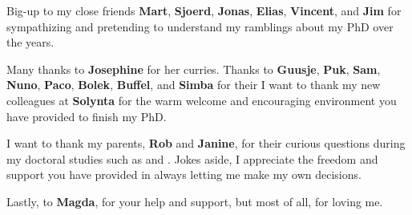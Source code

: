 \bigbreak \noindent
Big-up to my close friends \textbf{Mart}, \textbf{Sjoerd}, \textbf{Jonas}, \textbf{Elias}, \textbf{Vincent}, and \textbf{Jim} for sympathizing and pretending to understand my ramblings about my PhD over the years. 

\bigbreak \noindent
Many thanks to \textbf{Josephine} for her curries.
Thanks to \textbf{Guusje}, \textbf{Puk}, \textbf{Sam}, \textbf{Nuno}, \textbf{Paco}, \textbf{Bolek}, \textbf{Buffel}, and \textbf{Simba} for their 
I want to thank my new colleagues at \textbf{Solynta} for the warm welcome and encouraging environment you have provided to finish my PhD. 

\bigbreak \noindent
I want to thank my parents, \textbf{Rob} and \textbf{Janine}, for their curious questions during my doctoral studies such as  and . Jokes aside, I appreciate the freedom and support you have provided in always letting me make my own decisions.

\bigbreak \noindent
Lastly, to \textbf{Magda}, for your help and support, but most of all, for loving me. 

\newpage